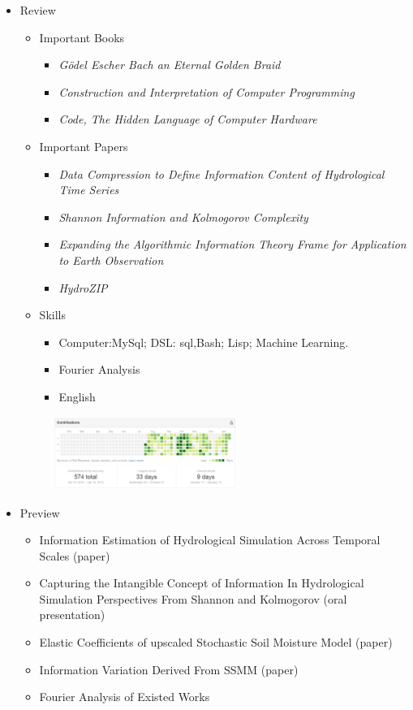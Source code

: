 \documentclass[11pt]{article}
\begin{document}
 \begin{CJK}{UTF8}{gkai}
\newpage
\begin{itemize}
\item Review
\begin{itemize}
\item Important Books
\begin{itemize}
\item \emph{G{\"o}del Escher Bach an Eternal Golden Braid}
\item \emph{Construction and Interpretation of Computer Programming}
\item \emph{Code, The Hidden Language of Computer Hardware}
\end{itemize}
\item Important Papers
\begin{itemize}
\item \emph{Data Compression to Define Information Content of Hydrological Time Series}
\item \emph{Shannon Information and Kolmogorov Complexity}
\item \emph{Expanding the Algorithmic Information Theory Frame for Application to Earth Observation}
\item \emph{HydroZIP}
\end{itemize}
\item Skills
\begin{itemize}
\item Computer:MySql; DSL: sql,Bash; Lisp; Machine Learning.
\item Fourier Analysis 
\item English
\end{itemize} 
\end{itemize}
\begin{figure}[H]
\centering
\includegraphics[width=6cm]{github.png} 
\end{figure}
\item Preview
\begin{itemize}
\item Information Estimation of Hydrological Simulation Across Temporal Scales (paper)
\item Capturing the Intangible Concept of Information In Hydrological Simulation \raisebox{0.5mm}{------}Perspectives From Shannon and Kolmogorov (oral presentation)
\item Elastic Coefficients of upscaled Stochastic Soil Moisture Model (paper)
\item Information Variation Derived From SSMM (paper)
\item Fourier Analysis of Existed Works  
\end{itemize}
\end{itemize}

\end{CJK}
\end{document}
